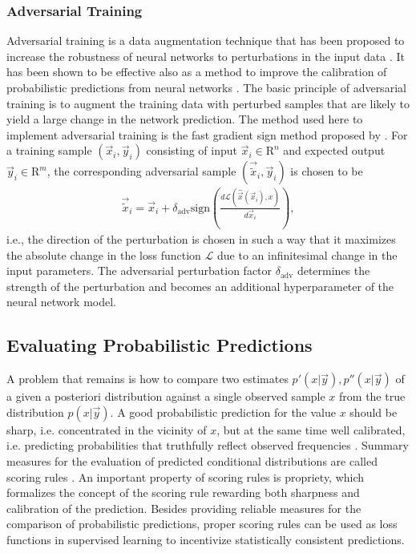 \documentclass[journal abbreviation, manuscript]{copernicus}
\begin{document}
\subsubsection{Adversarial Training}
\label{sec:adversarial_training}

  Adversarial training is a data augmentation technique that has been proposed
  to increase the robustness of neural networks to perturbations in the input
  data \citep{goodfellow_2}. It has been shown to be effective also as a method
  to improve the calibration of probabilistic predictions from neural networks
  \citep{lakshminarayanan}. The basic principle of adversarial training is to
  augment the training data with perturbed samples that are likely to
  yield a large change in the network prediction. The method used here to
  implement adversarial training  is the fast gradient sign method
  proposed by \citet{goodfellow_2}. For a training sample $(\vec{x}_i, \vec{y}_i)$
  consisting of input $\vec{x}_i \in \mathrm{R}^{n}$ and expected output
  $\vec{y}_i \in \mathrm{R}^m$, the corresponding adversarial sample
  $(\vec{\tilde{x}}_i, \vec{y}_i)$ is chosen to be
    \begin{align}\label{eq:adversarial_training}
      \vec{\tilde{x}}_i = \vec{x}_i + \delta_\text{adv} \text{sign} \left (
     \frac{d \mathcal{L}(\hat{\vec{x}}(\vec{x}_i), x)}{d\vec{x}_i}
      \right ),
    \end{align}
    i.e., the direction of the perturbation is chosen in such a way that
    it maximizes the absolute change in the loss function $\mathcal{L}$ due
    to an infinitesimal change in the input parameters. The adversarial
    perturbation factor $\delta_{\text{adv}}$ determines the strength of the perturbation
    and becomes an additional hyperparameter of the neural network model.

\subsection{Evaluating Probabilistic Predictions}

A problem that remains is how to compare two estimates $p'(x | \vec{y}), p''(x
| \vec{y})$ of a given a posteriori distribution against a single observed sample
$x$ from the true distribution $p(x | \vec{y})$. A good
probabilistic prediction for the value $x$ should be sharp, i.e. concentrated in
the vicinity of $x$, but at the same time well calibrated, i.e. predicting
probabilities that truthfully reflect observed frequencies \citep{gneiting_2}.
Summary measures for the evaluation of predicted conditional distributions are
called scoring rules \citep{gneiting}. An important property of scoring rules
is propriety, which formalizes the concept of the scoring rule rewarding both
sharpness and calibration of the prediction. Besides providing reliable
measures for the comparison of probabilistic predictions, proper scoring rules
can be used as loss functions in supervised learning to incentivize
statistically consistent predictions.
\end{document}
